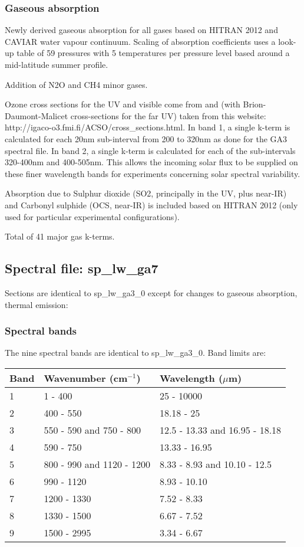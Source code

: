 \subsubsection*{Gaseous absorption}

Newly derived gaseous absorption for all gases based on HITRAN 2012 and CAVIAR water vapour continuum. Scaling of absorption coefficients uses a look-up table of 59 pressures with 5 temperatures per pressure level based around a mid-latitude summer profile.

Addition of N2O and CH4 minor gases.

Ozone cross sections for the UV and visible come from \citet{Serdyuchenko2014} and \citet{Gorshelev2014} (with Brion-Daumont-Malicet cross-sections for the far UV) taken from this website: http://igaco-o3.fmi.fi/ACSO/cross\_sections.html. In band 1, a single k-term is calculated for each 20nm sub-interval from 200 to 320nm as done for the GA3 spectral file. In band 2, a single k-term is calculated for each of the sub-intervals 320-400nm and 400-505nm. This allows the incoming solar flux to be supplied on these finer wavelength bands for experiments concerning solar spectral variability.

Absorption due to Sulphur dioxide (SO2, principally in the UV, plus near-IR) and Carbonyl sulphide (OCS, near-IR) is included based on HITRAN 2012 (only used for particular experimental configurations).

Total of 41 major gas k-terms.


\subsection*{Spectral file: sp\_lw\_ga7}

Sections are identical to sp\_lw\_ga3\_0 except for changes to gaseous absorption, thermal emission:

\subsubsection*{Spectral bands}

The nine spectral bands are identical to sp\_lw\_ga3\_0. Band limits are:

\begin{tabular}{l|l|l}
Band & Wavenumber (cm$^{-1}$) & Wavelength ($\mu$m)\\ \hline
1 & 1 - 400 & 25 - 10000 \\
2 & 400 - 550 & 18.18 - 25\\
3 & 550 - 590 and 750 - 800 & 12.5 - 13.33 and 16.95 - 18.18\\
4 & 590 - 750 & 13.33 - 16.95 \\
5 & 800 - 990 and 1120 - 1200 & 8.33 - 8.93 and 10.10 - 12.5\\
6 & 990 - 1120 & 8.93 - 10.10\\
7 & 1200 - 1330 & 7.52 - 8.33\\
8 & 1330 - 1500 & 6.67 - 7.52\\
9 & 1500 - 2995 & 3.34 - 6.67\\
\end{tabular}


